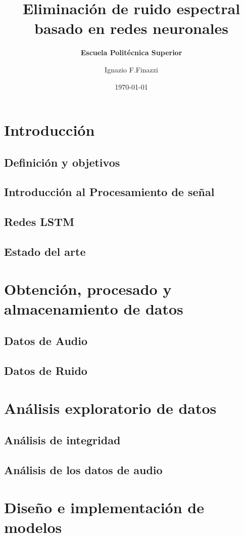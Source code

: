 \documentclass[10pt]{beamer}
\title[] %
{ %
      \textbf{Eliminación de ruido espectral basado en redes neuronales}
}
\subtitle[Escuela Politécnica Superior]
{
      \textbf{Escuela Politécnica Superior}
}
\author[Ignazio F.Finazzi]
{      Ignazio F.Finazzi \\
      {}
}
\institute[]
{
      Escuela Politécnica Superior\\
      Universidad Europea Miguel de Cervantes\\
  
}
\date{\today}
\begin{document}
	
	
	\scriptsize
	\section{Introducción}
		\subsection{Definición y objetivos}
			
		\subsection{Introducción al Procesamiento de señal}
			
		\subsection{Redes LSTM}
			
		\subsection{Estado del arte}
			
	\section{Obtención, procesado y almacenamiento de datos}
		\subsection{Datos de Audio}
			
		\subsection{Datos de Ruido}
			
	\section{Análisis exploratorio de datos}
		\subsection{Análisis de integridad}
			
		\subsection{Análisis de los datos de audio}
			
	\section{Diseño e implementación de modelos}
\end{document}

